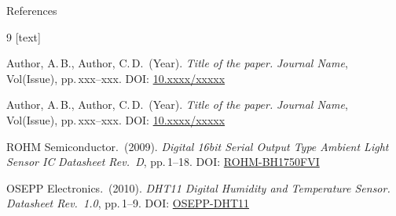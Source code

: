 \documentclass[aspectratio=169, 10pt]{beamer}
\begin{document}
\begin{frame}{References}
  \begin{thebibliography}{9}
    [text]

    Author, A.\,B., Author, C.\,D.\ (Year).
    \textit{Title of the paper.}
    \textit{Journal Name}, Vol(Issue), pp.\,xxx--xxx.
    DOI: \href{https://doi.org/10.xxxx/xxxxx}{10.xxxx/xxxxx}

    Author, A.\,B., Author, C.\,D.\ (Year).
    \textit{Title of the paper.}
    \textit{Journal Name}, Vol(Issue), pp.\,xxx--xxx.
    DOI: \href{https://doi.org/10.xxxx/xxxxx}{10.xxxx/xxxxx}

    ROHM Semiconductor.\ (2009).
    \textit{Digital 16bit Serial Output Type 
Ambient Light Sensor IC}
    \textit{Datasheet Rev.\ D}, pp.\,1--18.
    DOI: \href{https://www.alldatasheet.vn/datasheet-pdf/pdf/338083/ROHM/BH1750FVI.html}{ROHM-BH1750FVI}

    OSEPP Electronics.\ (2010).
    \textit{DHT11 Digital Humidity and Temperature Sensor.}
    \textit{Datasheet Rev.\ 1.0}, pp.\,1--9.
    DOI: \href{https://www.alldatasheet.com/datasheet-pdf/pdf/2193416/OSEPP/DHT11.html}{OSEPP-DHT11}

  \end{thebibliography}
\end{frame}


\end{document}
